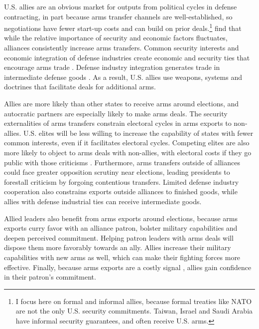 \documentclass[12pt]{article}
\begin{document}
U.S. allies are an obvious market for outputs from political cycles in defense contracting, in part because arms transfer channels are well-established, so negotiations have fewer start-up costs and can build on prior deals.\footnote{I focus here on formal and informal allies, because formal treaties like NATO are not the only U.S. security commitments. Taiwan, Israel and Saudi Arabia have informal security guarantees, and often receive U.S. arms.}
\citet{Thurneretal2019} find that while the relative importance of security and economic factors fluctuates, alliances consistently increase arms transfers.
Common security interests and economic integration of defense industries create economic and security ties that encourage arms trade \citep{Bitzinger1994}. 
Defense industry integration generates trade in intermediate defense goods \citep{Brooks2005}. 
As a result, U.S. allies use weapons, systems and doctrines that facilitate deals for additional arms. 


Allies are more likely than other states to receive arms around elections, and autocratic partners are especially likely to make arms deals. 
The security externalities of arms transfers constrain electoral cycles in arms exports to non-allies. 
U.S. elites will be less willing to increase the capability of states with fewer common interests, even if it facilitates electoral cycles.
Competing elites are also more likely to object to arms deals with non-allies, with electoral costs if they go public with those criticisms \citep{Saunders2022}.
Furthermore, arms transfers outside of alliances could face greater opposition scrutiny near elections, leading presidents to forestall criticism by forgoing contentious transfers.
Limited defense industry cooperation also constrains exports outside alliances to finished goods, while allies with defense industrial ties can receive intermediate goods.



Allied leaders also benefit from arms exports around elections, because arms exports curry favor with an alliance patron, bolster military capabilities and deepen perceived commitment.
Helping patron leaders with arms deals will dispose them more favorably towards an ally. 
Allies increase their military capabilities with new arms as well, which can make their fighting forces more effective. 
Finally, because arms exports are a costly signal \citep{McManusYarhi-Milo2017}, allies gain confidence in their patron's commitment. 
\end{document}
